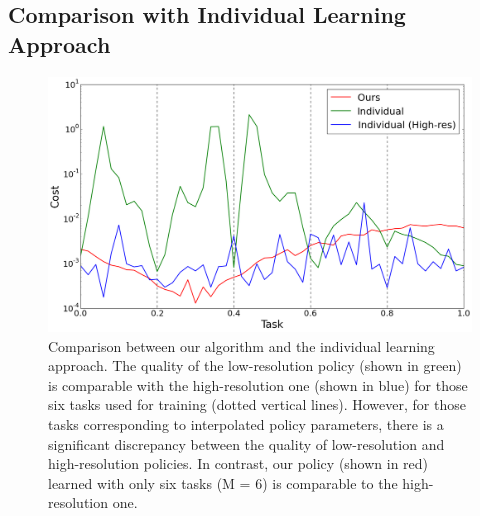 \subsection{Comparison with Individual Learning Approach}
\begin{figure}[h]
\center
  \includegraphics[width=4.5in]{images/plot_vs_ind}
  \caption{Comparison between our algorithm and the individual
    learning approach. The quality of the low-resolution policy
    (shown in green) is comparable with the high-resolution one (shown
    in blue) for those six tasks used for training (dotted vertical
    lines). However, for those tasks corresponding to interpolated
    policy parameters, there is a significant discrepancy between the
    quality of low-resolution and high-resolution policies. In
    contrast, our policy (shown in red) learned with only six tasks (M
    = 6) is comparable to the high-resolution one.}


  \label{fig:optskills_vs_ind}
\end{figure}

